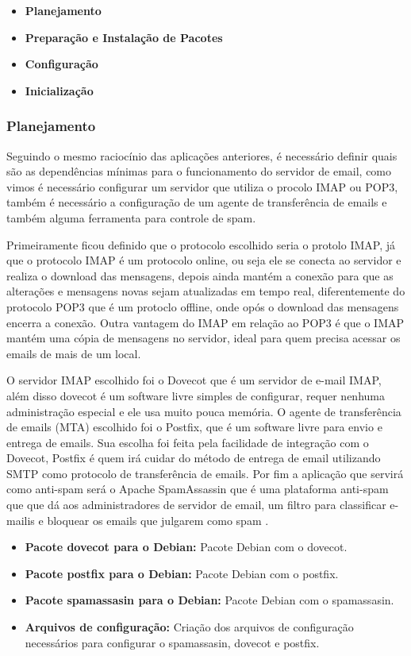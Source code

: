  \begin{itemize}
   \item  \textbf{Planejamento}
   \item  \textbf{Preparação e Instalação de Pacotes}
   \item  \textbf{Configuração}
   \item  \textbf{Inicialização}
 \end{itemize}

\subsubsection{Planejamento}

Seguindo o mesmo raciocínio das aplicações anteriores, é necessário definir
quais são as dependências mínimas para o funcionamento do servidor de email,
como vimos é necessário configurar um servidor que utiliza o procolo IMAP ou POP3,
também é necessário a configuração de um agente de transferência de emails e também
alguma ferramenta para controle de spam.

Primeiramente ficou definido que o protocolo escolhido seria o protolo IMAP, já
que o protocolo IMAP é um protocolo online, ou seja ele se conecta ao servidor
e realiza o download das mensagens, depois ainda  mantém a conexão para que
as alterações e mensagens novas sejam atualizadas em tempo real, diferentemente do
protocolo POP3 que é um protoclo offline, onde opós o download das mensagens encerra
a conexão. Outra vantagem do IMAP em relação ao POP3 é que o IMAP mantém uma cópia
de mensagens no servidor, ideal para quem precisa acessar os emails de mais de um local.

O servidor IMAP escolhido foi o Dovecot que é um servidor de e-mail
IMAP, além disso dovecot é um software livre simples de configurar, requer nenhuma
administração especial e ele usa muito pouca memória\cite{dovecot}. O agente
de transferência de emails (MTA) escolhido foi o Postfix, que é um software
livre para envio e entrega de emails. Sua escolha foi feita pela facilidade de
integração com o Dovecot, Postfix é quem irá cuidar do método de entrega de email
utilizando SMTP como protocolo de transferência de emails. Por fim a aplicação
que servirá como anti-spam será o Apache SpamAssassin que é uma plataforma anti-spam
que que dá aos administradores de servidor de email, um filtro para classificar
 e-mailis e bloquear os emails que julgarem como spam \cite{spam}.

\begin{itemize}
   \item \textbf{Pacote dovecot para o Debian:} Pacote Debian com o dovecot.
   \item \textbf{Pacote postfix para o Debian:} Pacote Debian com o postfix.
   \item \textbf{Pacote spamassasin para o Debian:} Pacote Debian com o spamassasin.
   \item \textbf{Arquivos de configuração:} Criação dos arquivos de configuração
   necessários para configurar o spamassasin, dovecot e postfix.
\end{itemize}


